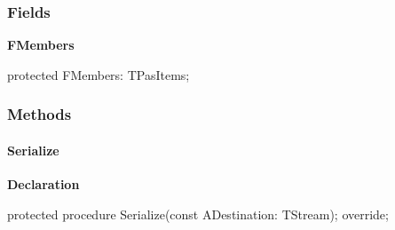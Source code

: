 \documentclass{report}
\newif\ifpdf
\begin{document}
\subsubsection*{\large{\textbf{Fields}}\normalsize\hspace{1ex}\hfill}
\begin{list}{}{
\setlength{\itemindent}{0cm}
\setlength{\listparindent}{0cm}
\setlength{\leftmargin}{\evensidemargin}
\addtolength{\leftmargin}{\tmplength}
\settowidth{\labelsep}{X}
\addtolength{\leftmargin}{\labelsep}
\setlength{\labelwidth}{\tmplength}
}
\label{PasDoc_Items.TPasEnum-FMembers}
\item[\textbf{FMembers}\hfill]
\ifpdf
\begin{flushleft}
\fi
\begin{ttfamily}
protected FMembers: TPasItems;\end{ttfamily}

\ifpdf
\end{flushleft}
\fi


\par  \end{list}
\subsubsection*{\large{\textbf{Methods}}\normalsize\hspace{1ex}\hfill}
\paragraph*{Serialize}\hspace*{\fill}

\label{PasDoc_Items.TPasEnum-Serialize}
\begin{list}{}{
\setlength{\itemindent}{0cm}
\setlength{\listparindent}{0cm}
\setlength{\leftmargin}{\evensidemargin}
\addtolength{\leftmargin}{\tmplength}
\settowidth{\labelsep}{X}
\addtolength{\leftmargin}{\labelsep}
\setlength{\labelwidth}{\tmplength}
}
\item[\textbf{Declaration}\hfill]
\ifpdf
\begin{flushleft}
\fi
\begin{ttfamily}
protected procedure Serialize(const ADestination: TStream); override;\end{ttfamily}

\ifpdf
\end{flushleft}
\fi

\end{list}
\end{document}
